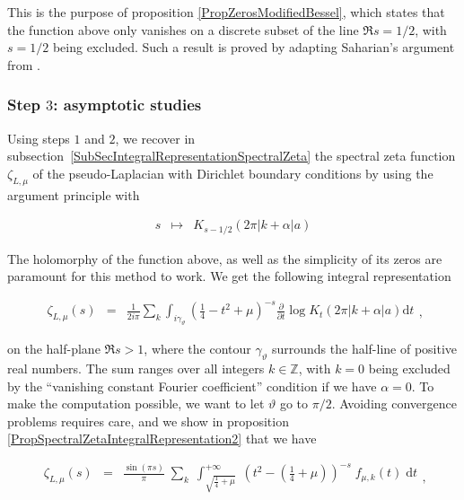 \documentclass{jams-l}
\theoremstyle{definition}
\theoremstyle{remark}
\numberwithin{equation}{section}
\begin{document}
            \noindent This is the purpose of proposition \ref{PropZerosModifiedBessel}, which states that the function above only vanishes on a discrete subset of the line $\Re s = 1/2$, with $s=1/2$ being excluded. Such a result is proved by adapting Saharian's argument from \cite[Appendix A]{MR2439244}.
            
        
        \subsubsection{Step $3$: asymptotic studies}
        
            Using steps $1$ and $2$, we recover in subsection~\ref{SubSecIntegralRepresentationSpectralZeta} the spectral zeta function $\zeta_{L,\mu}$ of the pseudo-Laplacian with Dirichlet boundary conditions by using the argument principle with
            
            \[ \begin{array}{lll}
                    s & \longmapsto & K_{s-1/2} \left( 2 \pi \left \vert k + \alpha \right \vert a \right)
                \end{array} \]
            
            \noindent The holomorphy of the function above, as well as the simplicity of its zeros are paramount for this method to work. We get the following integral representation
            
            \[ \begin{array}{lll}
                    \zeta_{L,\mu} \left( s \right) & = & \frac{1}{2 i \pi} \sum\limits_k \int_{i \gamma_{\vartheta}} \left( \frac{1}{4} - t^2 + \mu \right)^{-s} \frac{\partial}{\partial t} \log K_t \left( 2 \pi \left \vert k + \alpha \right \vert a \right) \mathrm{d}t
                \end{array} , \]
            
            \noindent on the half-plane $\Re s > 1$, where the contour $\gamma_{\vartheta}$ surrounds the half-line of positive real numbers. The sum ranges over all integers $k \in \mathbb{Z}$, with $k=0$ being excluded by the ``vanishing constant Fourier coefficient'' condition if we have $\alpha = 0$. To make the computation possible, we want to let $\vartheta$ go to $\pi/2$. Avoiding convergence problems requires care, and we show in proposition \ref{PropSpectralZetaIntegralRepresentation2} that we have
            
            \begin{equation}
            \label{SpectralZetaIntegralRepresentation}
                \begin{array}{lll}
                    \zeta_{L, \mu} \left( s \right) & = & \frac{\sin \left( \pi s \right)}{\pi} \; \sum\limits_k \; \int_{\sqrt{\frac{1}{4}+\mu}}^{+\infty} \; \left( t^2 - \left( \frac{1}{4} + \mu \right) \right)^{-s} \; f_{\mu,k} \left( t \right) \; \text{d}t
                \end{array} ,
            \end{equation}
            
\end{document}
